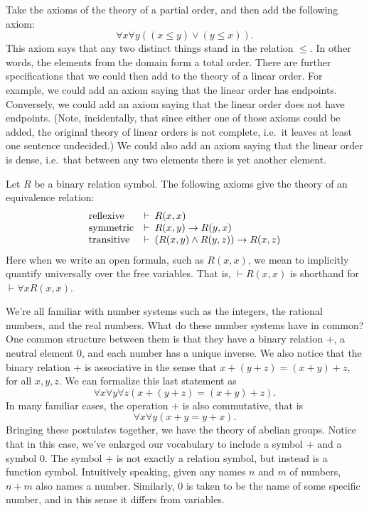 \begin{example} Take the axioms of the
  theory of a partial order, and then add the following axiom:
  \[ \forall x\forall y((x\leq y)\vee (y\leq x)) .\] This axiom says
  that any two distinct things stand in the relation $\leq$.  In other
  words, the elements from the domain form a total order.  There are
  further specifications that we could then add to the theory of a
  linear order.  For example, we could add an axiom saying that the
  linear order has endpoints.  Conversely, we could add an axiom
  saying that the linear order does not have endpoints.  (Note,
  incidentally, that since either one of those axioms could be added,
  the original theory of linear orders is not complete, i.e.\ it
  leaves at least one sentence undecided.)  We could also add an axiom
  saying that the linear order is dense, i.e.\ that between any two
  elements there is yet another element.  \end{example}

\begin{example} Let $R$ be a
  binary relation symbol.  The following axioms give the theory of an
  equivalence relation:
  \[ \begin{array}{l l l}
       \text{reflexive} & \vdash \: R(x,x) \\
       \text{symmetric} & \vdash \: R(x,y)\to R(y,x) \\
       \text{transitive} & \vdash \: (R(x,y)\wedge R(y,z))\to
                           R(x,z) \end{array}
                       \] Here when we write an open formula, such as
$R(x,x)$, we mean to implicitly quantify universally over the free variables.  That is,
$\vdash R(x,x)$ is shorthand for $\vdash \forall xR(x,x)$.   \end{example}


\begin{example} We're all familiar with
  number systems such as the integers, the rational numbers, and the
  real numbers.  What do these number systems have in common?  One
  common structure between them is that they have a binary relation
  $+$, a neutral element $0$, and each number has a unique inverse.
  We also notice that the binary relation $+$ is associative in the
  sense that $x+(y+z)=(x+y)+z$, for all $x,y,z$.  We can formalize
  this last statement as
  \[ \forall x\forall y\forall z(x+(y+z)=(x+y)+z) .\] In many familiar
  cases, the operation $+$ is also commutative, that is
  \[ \forall x\forall y(x+y=y+x ) .\] Bringing these postulates
  together, we have the theory of abelian groups.  Notice that in this
  case, we've enlarged our vocabulary to include a symbol $+$ and a
  symbol $0$.  The symbol $+$ is not exactly a relation symbol, but
  instead is a function symbol.  Intuitively speaking, given any names
  $n$ and $m$ of numbers, $n+m$ also names a number.  Similarly, $0$
  is taken to be the name of some specific number, and in this sense
  it differs from variables.
\end{example}

